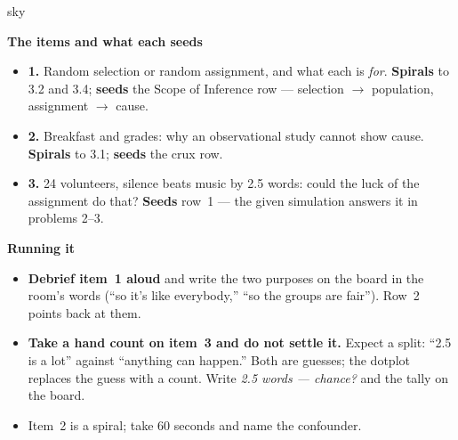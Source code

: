 \documentclass[10pt]{article}
\begin{document}
\boxguard[20]
\begin{skillbox}{sky}
\begin{minipage}[t]{0.48\linewidth}
    \textbf{The items and what each seeds}
    \begin{itemize}
        \item \textbf{1.} Random selection or random assignment, and what each is
              \emph{for}. \textbf{Spirals} to 3.2 and 3.4; \textbf{seeds} the Scope of
              Inference row --- selection $\to$ population, assignment $\to$ cause.
        \item \textbf{2.} Breakfast and grades: why an observational study cannot show
              cause. \textbf{Spirals} to 3.1; \textbf{seeds} the crux row.
        \item \textbf{3.} 24 volunteers, silence beats music by 2.5 words: could the luck of
              the assignment do that? \textbf{Seeds} row~1 --- the given simulation answers it
              in problems 2--3.
    \end{itemize}
\end{minipage}
\hfill
\begin{minipage}[t]{0.48\linewidth}
    \textbf{Running it}
    \begin{itemize}
        \item \textbf{Debrief item~1 aloud} and write the two purposes on the board in the
              room's words (``so it's like everybody,'' ``so the groups are fair''). Row~2
              points back at them.
        \item \textbf{Take a hand count on item~3 and do not settle it.} Expect a split:
              ``2.5 is a lot'' against ``anything can happen.'' Both are guesses; the dotplot
              replaces the guess with a count. Write \emph{2.5 words --- chance?} and the tally
              on the board.
        \item Item~2 is a spiral; take 60 seconds and name the confounder.
    \end{itemize}
\end{minipage}
\end{skillbox}
\end{document}
